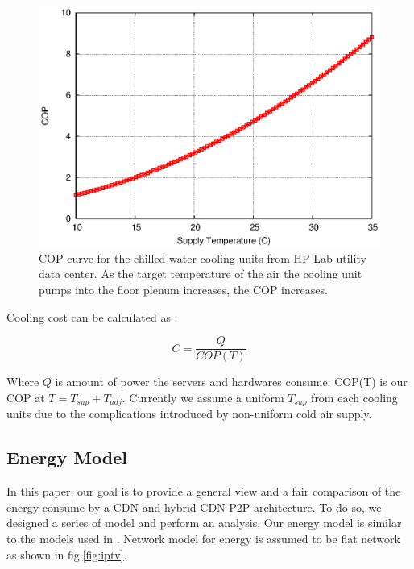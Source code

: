 \documentclass[conference]{IEEEtran}
\begin{document}
\begin{figure}[thb]
\begin{center}
\includegraphics[scale=0.6]{graphs/cop.eps}
\end{center}
\caption{COP curve for the chilled water cooling units from HP Lab utility data center.
As the target temperature of the air the cooling unit pumps into the floor plenum increases, the COP increases.}
\label{fig:twotier}
\end{figure} 

Cooling cost can be calculated as  \cite{moore2005making} :

\begin{equation}\label{eqn:cost}
C = \frac{Q}{COP(T)}
\end{equation}

Where $Q$ is amount of power the servers and hardwares consume.
COP(T) is our COP at $T=T_{sup}+T_{adj}$.
Currently we assume a uniform $T_{sup}$ from each cooling units due to the complications introduced by non-uniform cold air supply.


\subsection{Energy Model}\label{energy model}
In this paper, our goal is to provide a general view and a fair comparison of the energy consume by a CDN and hybrid CDN-P2P architecture. 
To do so, we designed a series of model and perform an analysis.
Our energy model is similar to the models used in \cite{Nedevschi:2008:HDC:1855610.1855618}.
Network model for energy is assumed to be flat network as shown in fig.\ref{fig:iptv}.
\end{document}

